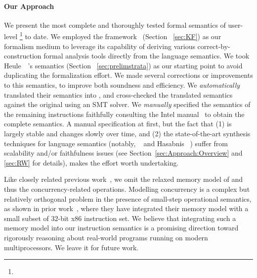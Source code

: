 \paragraph{Our Approach}

We present the most complete and thoroughly tested formal semantics of user-level \footnote{} to date.
We employed the \K framework~\cite{k-primer-2013-v32} (Section ~\ref{sec:KF}) as our formalism medium to leverage its capability of deriving various correct-by-construction formal analysis tools directly from the language semantics.
We took Heule~\etal~\cite{Heule2016a}'s semantics (Section ~\ref{sec:prelimstrata}) as our starting point to avoid duplicating the formalization effort. %
We made several corrections or improvements to this semantics, to improve both soundness and efficiency.
We \emph{automatically} translated their semantics into \K, and cross-checked the translated semantics against the original using an SMT solver.
We \emph{manually} specified the semantics of the remaining instructions faithfully consulting the Intel manual~\cite{IntelManual} to obtain the complete semantics. A manual specification  at first, but the fact that (1) \ISA is largely stable and changes slowly over time, and (2) the state-of-the-art synthesis techniques for language semantics (notably, \Strata~\cite{Heule2016a} and Hasabnis \etal~\cite{Hasabnis:ASPLOS16, Hasabnis:FSE16}) suffer from scalability and/or faithfulness issues (see Section~\ref{sec:Approach:Overview} and \ref{sec:RW} for details), makes the effort worth undertaking.


Like closely related previous work~\cite{Goel:FMCAD14,Heule2016a}, we omit the relaxed memory model of \ISA and thus the concurrency-related operations.
Modelling concurrency is a complex but relatively orthogonal problem in the presence of small-step operational semantics, as shown in prior work~\cite{Sarkar:POPL09,Owens:x86-TSO}, where they have integrated their memory model with a small subset of $32$-bit x86 instruction set.
We believe that integrating such a memory model into our instruction semantics is a promising direction toward rigorously reasoning about real-world programs running on modern multiprocessors. We leave it for future work.


